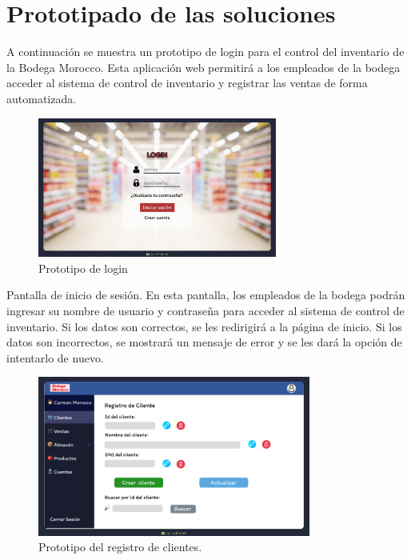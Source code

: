 \documentclass{article}
\begin{document}
\section{Prototipado de las soluciones}

A continuación se muestra un prototipo de login para el control del inventario de la Bodega Morocco. Esta aplicación web permitirá a los empleados de la bodega acceder al sistema de control de inventario y registrar las ventas de forma automatizada.


\begin{figure}[H]
  \centering
  \includegraphics[width=0.7\textwidth]{./assets/login.png}
  \caption{Prototipo de login}
\end{figure}

Pantalla de inicio de sesión. En esta pantalla, los empleados de la bodega podrán ingresar su nombre de usuario y contraseña para acceder al sistema de control de inventario. Si los datos son correctos, se les redirigirá a la página de inicio. Si los datos son incorrectos, se mostrará un mensaje de error y se les dará la opción de intentarlo de nuevo.

\begin{figure}[H]
  \centering
  \includegraphics[width=0.8\textwidth]{./assets/registro.png}
  \caption{Prototipo del registro de clientes.}
\end{figure}
\end{document}
